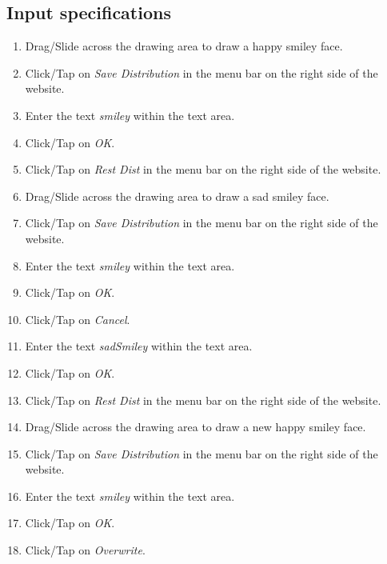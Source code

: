 \subsection*{Input specifications}
\begin{enumerate}
\item Drag/Slide across the drawing area to draw a happy smiley face.
\item Click/Tap on \emph{Save Distribution} in the menu bar on the right side of the website.
\item Enter the text \emph{smiley} within the text area.
\item Click/Tap on \emph{OK}.
\item Click/Tap on \emph{Rest Dist} in the menu bar on the right side of the website. 
\item Drag/Slide across the drawing area to draw a sad smiley face.
\item Click/Tap on \emph{Save Distribution} in the menu bar on the right side of the website.
\item Enter the text \emph{smiley} within the text area.
\item Click/Tap on \emph{OK}.
\item Click/Tap on \emph{Cancel}.
\item Enter the text \emph{sadSmiley} within the text area.
\item Click/Tap on \emph{OK}.
\item Click/Tap on \emph{Rest Dist} in the menu bar on the right side of the website.
\item Drag/Slide across the drawing area to draw a new happy smiley face.
\item Click/Tap on \emph{Save Distribution} in the menu bar on the right side of the website.
\item Enter the text \emph{smiley} within the text area.
\item Click/Tap on \emph{OK}.
\item Click/Tap on \emph{Overwrite}.
\end{enumerate}

